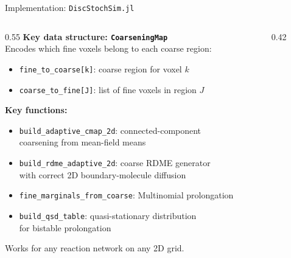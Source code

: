 \documentclass[10pt,aspectratio=169]{beamer}
\begin{document}
\begin{frame}{Implementation: \texttt{DiscStochSim.jl}}

\begin{columns}[T]
\begin{column}{0.55\textwidth}
  \textbf{Key data structure: \texttt{CoarseningMap}}\\[0.4em]
  Encodes which fine voxels belong to each coarse region:
  \begin{itemize}
    \item \texttt{fine\_to\_coarse[k]}: coarse region for voxel $k$
    \item \texttt{coarse\_to\_fine[J]}: list of fine voxels in region $J$
  \end{itemize}

  \bigskip
  \textbf{Key functions:}
  \begin{itemize}\setlength\itemsep{0.4em}
    \item \texttt{build\_adaptive\_cmap\_2d}: connected-component\\
          coarsening from mean-field means
    \item \texttt{build\_rdme\_adaptive\_2d}: coarse RDME generator\\
          with correct 2D boundary-molecule diffusion
    \item \texttt{fine\_marginals\_from\_coarse}: Multinomial prolongation
    \item \texttt{build\_qsd\_table}: quasi-stationary distribution\\
          for bistable prolongation
  \end{itemize}

  \medskip
  {\small Works for any reaction network on any 2D grid.}
\end{column}
\begin{column}{0.42\textwidth}
  \centering
\end{column}
\end{columns}
\end{frame}
\end{document}
